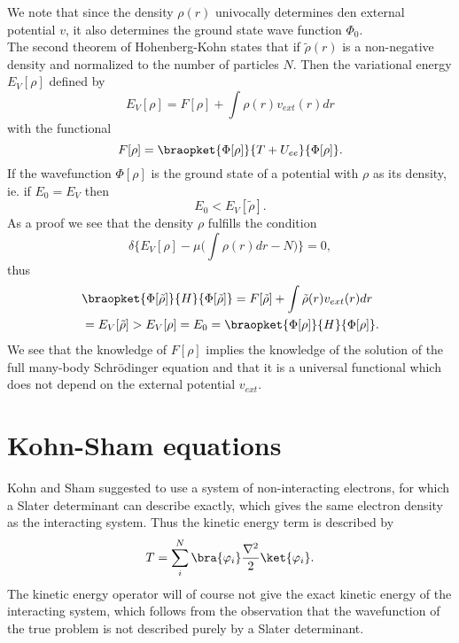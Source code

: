 \documentclass[a4paper,10pt,english]{article}%
\begin{document}
We note that since the density $\rho(r)$ univocally determines den external potential $v$, it also determines the ground state wave function $\Phi_0$.\\

The second theorem of Hohenberg-Kohn states that if $\tilde \rho(r)$ is a non-negative density and normalized to the number of particles $N$. Then the 
variational energy $E_V[\rho]$ defined by
\begin{equation}
  E_V[\rho]=F[\rho]+\int\rho(r)v_{ext}(r)dr
  \label{s1eq:energyv}
\end{equation}
with the functional 
\begin{equation}
  F[\rho]=\braopket{\Phi[\rho]}{T+U_{ee}}{\Phi[\rho]}.
  \label{s1eq:Fu}
\end{equation}
If the wavefunction $\Phi[\rho]$ is the ground state of a potential with $\rho$ as its density, ie. if $E_0=E_V$ then 
\begin{equation*}
  E_0 < E_V[\tilde \rho].
\end{equation*} 
As a proof we see that the density $\rho$ fulfills the condition 
\begin{equation}
  \delta\big\{E_V[\rho]-\mu\big(\int\rho(r)dr-N\big)\big\}=0,
  \label{s1eq:variationl}
\end{equation}
thus 
\begin{equation}
  \begin{split}
	&\braopket{\Phi[\tilde \rho]}{H}{\Phi[\tilde \rho]}=F[\tilde \rho]+\int\tilde \rho(r)v_{ext}(r)dr\\
	&=E_{V}[\tilde \rho]>E_V[\rho]=E_0=\braopket{\Phi[\rho]}{H}{\Phi[\rho]}.
  \end{split}
  \label{s1eq:proof2}
\end{equation}
We see that the knowledge of $F[\rho]$ implies the knowledge of the solution of
the full many-body Schr\"odinger equation and that it is a universal functional
which does not depend on the external potential $v_{ext}$.

\section{Kohn-Sham equations}

Kohn and Sham \cite{Kohn1965}  suggested to use a system of non-interacting electrons, 
for which a Slater determinant can describe exactly, which gives the same
electron density as the interacting system. Thus the kinetic energy term is described by 
\begin{equation}
  T=\sum_i^N \bra{\varphi_i}\frac{\nabla^2}{2}\ket{\varphi_i}.
  \label{s2ksT}
\end{equation}
The kinetic energy operator will of course not give the exact kinetic energy of
the interacting system, which follows from the observation that the wavefunction
of the true problem is not described purely by a Slater determinant.\\
\end{document}
